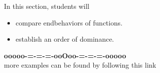 \documentclass{ximera}
\begin{document}
\begin{sectionOutcomes}
In this section, students will 

\begin{itemize}
\item compare endbehaviors of functions.
\item establish an order of dominance.
\end{itemize}
\end{sectionOutcomes}


















\begin{center}
\textbf{\textcolor{green!50!black}{ooooo-=-=-=-ooOoo-=-=-=-ooooo}} \\

more examples can be found by following this link\\ 

\end{center}
\end{document}

